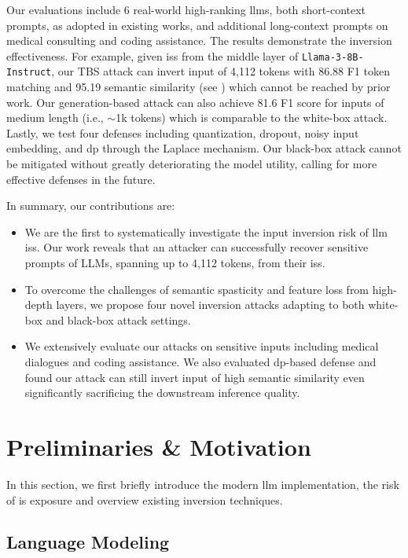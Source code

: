 \documentclass[letterpaper,twocolumn,10pt]{article}
\newcommand{\llama}{Llama}
\newcommand{\ie}{\hbox{{i.e.}}\xspace}
\theoremstyle{definition}
\begin{document}
Our evaluations include 6 real-world high-ranking \acp{llm}, both short-context prompts, as adopted in existing works, and additional long-context prompts on medical consulting and coding assistance.
The results demonstrate the inversion effectiveness.
For example, given \acp{is} from the middle layer of \texttt{\llama-3-8B-Instruct}, our TBS attack can invert input of 4,112 tokens with 86.88 F1 token matching and 95.19 semantic similarity (see ) which cannot be reached by prior work.
Our generation-based attack can also achieve 81.6 F1 score for inputs of medium length (\ie, $\sim$1k tokens) which is comparable to the white-box attack.
Lastly, we test four defenses including quantization, dropout, noisy input embedding, and \ac{dp} through the Laplace mechanism.
Our black-box attack cannot be mitigated without greatly deteriorating the model utility, calling for more effective defenses in the future.

In summary, our contributions are:
\begin{itemize}
    \item We are the first to systematically investigate the input inversion risk of \ac{llm} \acp{is}. Our work reveals that an attacker can successfully recover sensitive prompts of LLMs, spanning up to 4,112 tokens, from their \acp{is}.
    
    \item To overcome the challenges of semantic spasticity and feature loss from high-depth layers, we propose four novel inversion attacks adapting to both white-box and black-box attack settings.
    
    \item We extensively evaluate our attacks on sensitive inputs including medical dialogues and coding assistance. We also evaluated \ac{dp}-based defense and found our attack can still invert input of high semantic similarity even significantly sacrificing the downstream inference quality.
\end{itemize}



\section{Preliminaries \& Motivation}
In this section, we first briefly introduce the modern \ac{llm} implementation, the risk of \ac{is} exposure and overview existing inversion techniques.


\subsection{Language Modeling}
\end{document}
